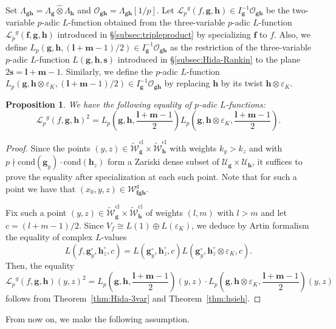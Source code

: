 \documentclass[a4paper,11pt]{amsart}
\theoremstyle{plain}
\newtheorem{propo}[theorem]{Proposition}
\theoremstyle{definition}
\theoremstyle{remark}
\newcommand{\cl}{\mathcal}
\newcommand{\Lp}{{\mathscr{L}_p}}
\newcommand{\hf}{{\mathbf{f}}}
\newcommand{\hg}{{\mathbf{g}}}
\newcommand{\hh}{{\mathbf h}}
\numberwithin{equation}{section}
\begin{document}
Set $\Lambda_{\hg\hh}=\Lambda_{\hg}\hat{\otimes}\Lambda_{\hh}$ and $\cl{O}_{\hg \hh}=\Lambda_{\hg\hh}[1/p]$. Let $\Lp^g(f,\hg,\hh)\in I_{\hg}^{-1}\cl{O}_{\hg \hh}$ be the two-variable $p$-adic $L$-function obtained from the three-variable $p$-adic $L$-function $\Lp^g(\hf,\hg,\hh)$ introduced in \S\ref{subsec:tripleproduct} by specializing $\hf$ to $f$. Also, we define $L_p(\hg,\hh,(\mathbf{l}+\mathbf{m}-1)/2)\in I_\hg^{-1}\cl{O}_{\hg \hh}$ as the restriction of the three-variable $p$-adic $L$-function $L(\hg,\hh,\mathbf{s})$ introduced in \S\ref{subsec:Hida-Rankin} to the plane $2\mathbf{s}=\mathbf{l}+\mathbf{m}-1$. Similarly, we define the $p$-adic $L$-function $L_p(\hg,\hh\otimes\varepsilon_K,(\mathbf{l}+\mathbf{m}-1)/2)\in I_{\hg}^{-1}\cl{O}_{\hg \hh}$ by replacing $\hh$ by its twist $\hh\otimes \varepsilon_K$.


\begin{propo}\label{prop:factorization}
    We have the following equality of $p$-adic $L$-functions:
    \[
    \Lp^g(f,\hg,\hh)^2=L_p\left(\hg,\hh,\frac{\mathbf{l}+\mathbf{m}-1}{2}\right)L_p\left(\hg,\hh\otimes\varepsilon_K,\frac{\mathbf{l}+\mathbf{m}-1}{2}\right).
    \]
\end{propo}
\begin{proof}
    Since the points $(y,z)\in \tilde{\cl{W}}_{\hg}^{\mathrm{cl}}\times \tilde{\cl{W}}_{\hh}^{\mathrm{cl}}$ with weights $k_y>k_z$ and with $p\nmid \mathrm{cond}(\hg_y)\cdot \mathrm{cond}(\hh_z)$ form a Zariski dense subset of $\cl{U}_\hg\times\cl{U}_\hh$, it suffices to prove the equality after specialization at each such point. Note that for such a point we have that $(x_0,y,z)\in \cl{W}_{\hf \hg \hh}^g$.
    
    Fix such a point $(y,z)\in \tilde{\cl{W}}_\hg^{\mathrm{cl}}\times \tilde{\cl{W}}^{\mathrm{cl}}_\hh$ of weights $(l,m)$ with $l>m$ and let $c=(l+m-1)/2$. Since $V_f\cong L(1)\oplus L(\varepsilon_K)$, we deduce by Artin formalism the equality of complex $L$-values
    \[
    L(f,\hg_y^\circ,\hh_z^\circ,c)=L(\hg_y^\circ,\hh_z^\circ,c)L(\hg_y^\circ,\hh_z^\circ\otimes\varepsilon_K,c).
    \]
    Then, the equality
    \[
    \Lp^g(f,\hg,\hh)(y,z)^2=L_p\left(\hg,\hh,\frac{\mathbf{l}+\mathbf{m}-1}{2}\right)(y,z)\cdot L_p\left(\hg,\hh\otimes\varepsilon_K,\frac{\mathbf{l}+\mathbf{m}-1}{2}\right)(y,z)
    \]
    follows from Theorem~\ref{thm:Hida-3var} and Theorem~\ref{thm:hsieh}.
\end{proof}

From now on, we make the following assumption.
\end{document}
